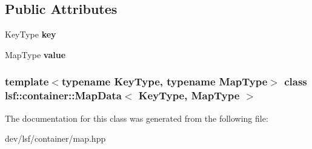\subsection*{Public Attributes}
\begin{DoxyCompactItemize}
\item 
\hypertarget{classlsf_1_1container_1_1MapData_a39d1db137ae810a635c72813fed82325}{
KeyType {\bfseries key}}
\label{classlsf_1_1container_1_1MapData_a39d1db137ae810a635c72813fed82325}

\item 
\hypertarget{classlsf_1_1container_1_1MapData_ae2dd1b136b0a86128e9ccada64c28bf6}{
MapType {\bfseries value}}
\label{classlsf_1_1container_1_1MapData_ae2dd1b136b0a86128e9ccada64c28bf6}

\end{DoxyCompactItemize}
\subsubsection*{template$<$typename KeyType, typename MapType$>$ class lsf::container::MapData$<$ KeyType, MapType $>$}



The documentation for this class was generated from the following file:\begin{DoxyCompactItemize}
\item 
dev/lsf/container/map.hpp\end{DoxyCompactItemize}
